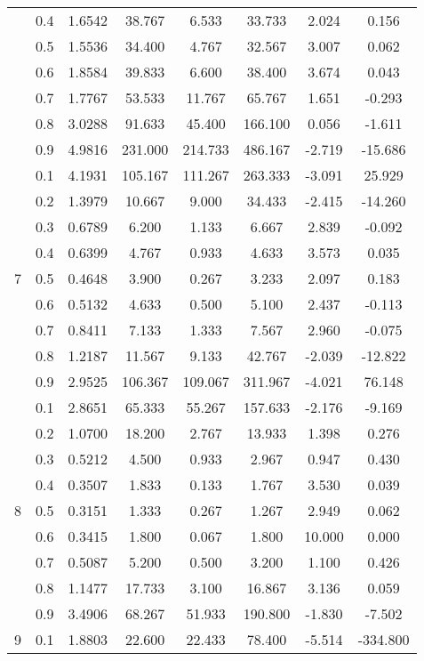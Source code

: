 \documentclass[11pt,a4paper]{report}
\begin{document}
\begin{longtable}{ | c | c || c | c | c | c | c | c | }
 & 0.4 & 1.6542 & 38.767 & 6.533 & 33.733 & 2.024 & 0.156 \\
 & 0.5 & 1.5536 & 34.400 & 4.767 & 32.567 & 3.007 & 0.062 \\
 & 0.6 & 1.8584 & 39.833 & 6.600 & 38.400 & 3.674 & 0.043 \\
 & 0.7 & 1.7767 & 53.533 & 11.767 & 65.767 & 1.651 & -0.293 \\
 & 0.8 & 3.0288 & 91.633 & 45.400 & 166.100 & 0.056 & -1.611 \\
 & 0.9 & 4.9816 & 231.000 & 214.733 & 486.167 & -2.719 & -15.686 \\
 \hline
\multirow{9}{*}{7} & 0.1 & 4.1931 & 105.167 & 111.267 & 263.333 & -3.091 & 25.929 \\
 & 0.2 & 1.3979 & 10.667 & 9.000 & 34.433 & -2.415 & -14.260 \\
 & 0.3 & 0.6789 & 6.200 & 1.133 & 6.667 & 2.839 & -0.092 \\
 & 0.4 & 0.6399 & 4.767 & 0.933 & 4.633 & 3.573 & 0.035 \\
 & 0.5 & 0.4648 & 3.900 & 0.267 & 3.233 & 2.097 & 0.183 \\
 & 0.6 & 0.5132 & 4.633 & 0.500 & 5.100 & 2.437 & -0.113 \\
 & 0.7 & 0.8411 & 7.133 & 1.333 & 7.567 & 2.960 & -0.075 \\
 & 0.8 & 1.2187 & 11.567 & 9.133 & 42.767 & -2.039 & -12.822 \\
 & 0.9 & 2.9525 & 106.367 & 109.067 & 311.967 & -4.021 & 76.148 \\
 \hline
\multirow{9}{*}{8} & 0.1 & 2.8651 & 65.333 & 55.267 & 157.633 & -2.176 & -9.169 \\
 & 0.2 & 1.0700 & 18.200 & 2.767 & 13.933 & 1.398 & 0.276 \\
 & 0.3 & 0.5212 & 4.500 & 0.933 & 2.967 & 0.947 & 0.430 \\
 & 0.4 & 0.3507 & 1.833 & 0.133 & 1.767 & 3.530 & 0.039 \\
 & 0.5 & 0.3151 & 1.333 & 0.267 & 1.267 & 2.949 & 0.062 \\
 & 0.6 & 0.3415 & 1.800 & 0.067 & 1.800 & 10.000 & 0.000 \\
 & 0.7 & 0.5087 & 5.200 & 0.500 & 3.200 & 1.100 & 0.426 \\
 & 0.8 & 1.1477 & 17.733 & 3.100 & 16.867 & 3.136 & 0.059 \\
 & 0.9 & 3.4906 & 68.267 & 51.933 & 190.800 & -1.830 & -7.502 \\
 \hline
\multirow{9}{*}{9} & 0.1 & 1.8803 & 22.600 & 22.433 & 78.400 & -5.514 & -334.800 \\

\end{longtable}
\end{document}

